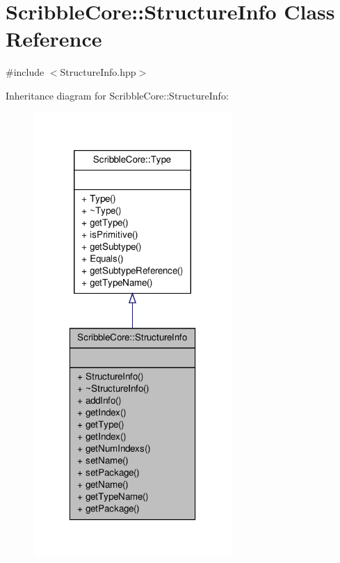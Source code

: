 \hypertarget{class_scribble_core_1_1_structure_info}{\section{Scribble\-Core\-:\-:Structure\-Info Class Reference}
\label{class_scribble_core_1_1_structure_info}
}


{\ttfamily \#include $<$Structure\-Info.\-hpp$>$}



Inheritance diagram for Scribble\-Core\-:\-:Structure\-Info\-:
\nopagebreak
\begin{figure}[H]
\begin{center}
\leavevmode
\includegraphics[width=214pt]{class_scribble_core_1_1_structure_info__inherit__graph}
\end{center}
\end{figure}


